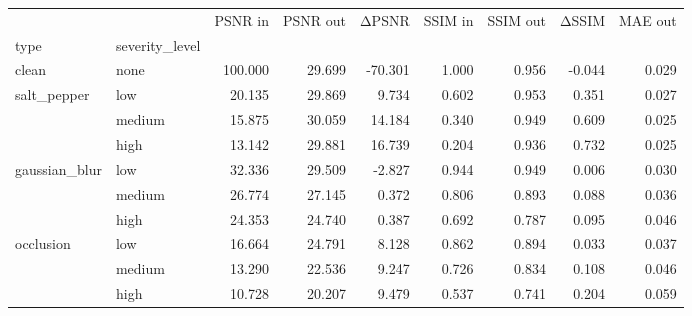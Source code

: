 \begin{tabular}{llrrrrrrr}
\toprule
 &  & PSNR in & PSNR out & ΔPSNR & SSIM in & SSIM out & ΔSSIM & MAE out \\
type & severity_level &  &  &  &  &  &  &  \\
\midrule
clean & none & 100.000 & 29.699 & -70.301 & 1.000 & 0.956 & -0.044 & 0.029 \\
\cline{1-9}
\multirow[t]{3}{*}{salt_pepper} & low & 20.135 & 29.869 & 9.734 & 0.602 & 0.953 & 0.351 & 0.027 \\
 & medium & 15.875 & 30.059 & 14.184 & 0.340 & 0.949 & 0.609 & 0.025 \\
 & high & 13.142 & 29.881 & 16.739 & 0.204 & 0.936 & 0.732 & 0.025 \\
\cline{1-9}
\multirow[t]{3}{*}{gaussian_blur} & low & 32.336 & 29.509 & -2.827 & 0.944 & 0.949 & 0.006 & 0.030 \\
 & medium & 26.774 & 27.145 & 0.372 & 0.806 & 0.893 & 0.088 & 0.036 \\
 & high & 24.353 & 24.740 & 0.387 & 0.692 & 0.787 & 0.095 & 0.046 \\
\cline{1-9}
\multirow[t]{3}{*}{occlusion} & low & 16.664 & 24.791 & 8.128 & 0.862 & 0.894 & 0.033 & 0.037 \\
 & medium & 13.290 & 22.536 & 9.247 & 0.726 & 0.834 & 0.108 & 0.046 \\
 & high & 10.728 & 20.207 & 9.479 & 0.537 & 0.741 & 0.204 & 0.059 \\
\cline{1-9}
\bottomrule
\end{tabular}
